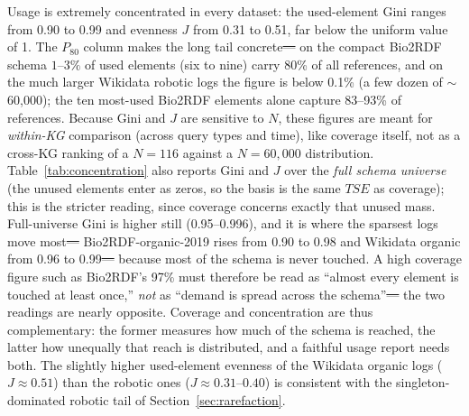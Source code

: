\documentclass[sw]{iosart2x}
\providecommand{\DIFadd}[1]{{\protect\color{blue}\uwave{#1}}} %
\providecommand{\DIFdel}[1]{{\protect\color{red}\sout{#1}}} %
\providecommand{\DIFaddbegin}{} %
\providecommand{\DIFaddend}{} %
\providecommand{\DIFdelbegin}{} %
\providecommand{\DIFdelend}{} %
\providecommand{\DIFscaledelfig}{0.5}
\newlength{\DIFdelgraphicswidth} %
\newlength{\DIFdelgraphicsheight} %
\providecommand{\DIFaddincludegraphics}[2][]{{\color{blue}\fbox{\DIFOincludegraphics[#1]{#2}}}} %
\providecommand{\DIFdelincludegraphics}[2][]{%
\sbox{\DIFdelgraphicsbox}{\DIFOincludegraphics[#1]{#2}}%
\settoboxwidth{\DIFdelgraphicswidth}{\DIFdelgraphicsbox} %
\settoboxtotalheight{\DIFdelgraphicsheight}{\DIFdelgraphicsbox} %
\scalebox{\DIFscaledelfig}{%
\parbox[b]{\DIFdelgraphicswidth}{\usebox{\DIFdelgraphicsbox}\\[-\baselineskip] \rule{\DIFdelgraphicswidth}{0em}}\llap{\resizebox{\DIFdelgraphicswidth}{\DIFdelgraphicsheight}{%
\setlength{\unitlength}{\DIFdelgraphicswidth}%
\begin{picture}(1,1)%
\thicklines\linethickness{2pt} %
{\color[rgb]{1,0,0}\put(0,0){\framebox(1,1){}}}%
{\color[rgb]{1,0,0}\put(0,0){\line( 1,1){1}}}%
{\color[rgb]{1,0,0}\put(0,1){\line(1,-1){1}}}%
\end{picture}%
}\hspace*{3pt}}} %
} %
\DeclareRobustCommand{\DIFaddbegin}{\DIFOaddbegin \let\includegraphics\DIFaddincludegraphics} %
\DeclareRobustCommand{\DIFaddend}{\DIFOaddend \let\includegraphics\DIFOincludegraphics} %
\DeclareRobustCommand{\DIFdelbegin}{\DIFOdelbegin \let\includegraphics\DIFdelincludegraphics} %
\DeclareRobustCommand{\DIFdelend}{\DIFOaddend \let\includegraphics\DIFOincludegraphics} %
\begin{document}
Usage is extremely concentrated in every dataset: the used-element Gini ranges from 0.90 to 0.99 and evenness $J$ from 0.31 to 0.51, far below the uniform value of 1. The $P_{80}$ column makes the long tail concrete\DIFdelbegin \DIFdel{--- }\DIFdelend \DIFaddbegin \DIFadd{: }\DIFaddend on the compact Bio2RDF schema $1$--$3\%$ of used elements (six to nine) carry 80\% of all references, and on the much larger Wikidata robotic logs the figure is below 0.1\% (a few dozen of $\sim$60{,}000); the ten most-used Bio2RDF elements alone capture 83--93\% of references. Because Gini and $J$ are sensitive to $N$, these figures are meant for \emph{within-KG} comparison (across query types and time), like coverage itself, not as a cross-KG ranking of a $N{=}116$ against a $N{=}60{,}000$ distribution. Table~\ref{tab:concentration} also reports Gini and $J$ over the \emph{full schema universe} (the unused elements enter as zeros, so the basis is the same $TSE$ as coverage); this is the stricter reading, since coverage concerns exactly that unused mass. Full-universe Gini is higher still (0.95--0.996), and it is where the sparsest logs move most\DIFdelbegin \DIFdel{--- }\DIFdelend \DIFaddbegin \DIFadd{: }\DIFaddend Bio2RDF-organic-2019 rises from 0.90 to 0.98 and Wikidata organic from 0.96 to 0.99\DIFdelbegin \DIFdel{--- }\DIFdelend \DIFaddbegin \DIFadd{, }\DIFaddend because most of the schema is never touched. A high coverage figure such as Bio2RDF's 97\% must therefore be read as ``almost every element is touched at least once,'' \emph{not} as ``demand is spread across the schema''\DIFdelbegin \DIFdel{--- }\DIFdelend \DIFaddbegin \DIFadd{, }\DIFaddend the two readings are nearly opposite. Coverage and concentration are thus complementary: the former measures how much of the schema is reached, the latter how unequally that reach is distributed, and a faithful usage report needs both. The slightly higher used-element evenness of the Wikidata organic logs ($J \approx 0.51$) than the robotic ones ($J \approx 0.31$--$0.40$) is consistent with the singleton-dominated robotic tail of Section~\ref{sec:rarefaction}.
\end{document}
